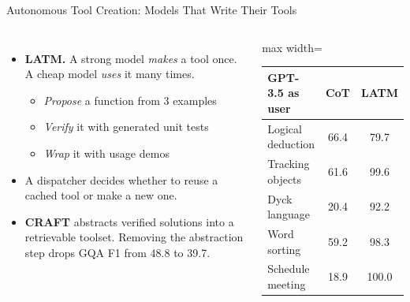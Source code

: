 \begin{frame}{Autonomous Tool Creation: Models That Write Their Tools}
    \begin{columns}[T,onlytextwidth]
        \begin{itemize}\itemsep0.45em
            \item \textbf{LATM.} A strong model \emph{makes} a tool once. A cheap model \emph{uses} it many times.
            \begin{itemize}\itemsep0.15em
                \item \emph{Propose} a function from 3 examples
                \item \emph{Verify} it with generated unit tests
                \item \emph{Wrap} it with usage demos
            \end{itemize}
            \item A dispatcher decides whether to reuse a cached tool or make a new one.
            \item \textbf{CRAFT} abstracts verified solutions into a retrievable toolset. Removing the abstraction step drops GQA F1 from 48.8 to 39.7.
        \end{itemize}
        \centering
        \small
        \begin{adjustbox}{max width=\linewidth}\begin{tabular}{lcc}
            \toprule
            \textbf{GPT-3.5 as user} & \textbf{CoT} & \textbf{LATM} \\
            \midrule
            Logical deduction & 66.4 & 79.7 \\
            Tracking objects & 61.6 & 99.6 \\
            Dyck language & 20.4 & 92.2 \\
            Word sorting & 59.2 & 98.3 \\
            Schedule meeting & 18.9 & 100.0 \\
            \bottomrule
        \end{tabular}\end{adjustbox}
    \end{columns}
    \vspace{0.4em}
\end{frame}

